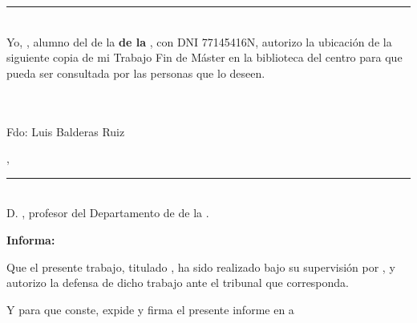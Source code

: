 \documentclass['../proyecto.tex']{memoir}
\begin{document}
\thispagestyle{empty}

\noindent\rule[-1ex]{\textwidth}{2pt}\\[4.5ex]

Yo, \textbf{\AuthorName}, alumno del \Degree de la
\textbf{\FacultyOne de la \University}, con DNI 77145416N, autorizo la
ubicación de la siguiente copia de mi Trabajo Fin de Máster en la
biblioteca del centro para que pueda ser consultada por las personas
que lo deseen.

\vspace{6cm}

\\~\\
\noindent Fdo: Luis Balderas Ruiz

\vspace{2cm}

\begin{flushright}
  \Location, \Time
\end{flushright}

\newpage

\thispagestyle{empty}

\noindent\rule[-1ex]{\textwidth}{2pt}\\[4.5ex]

D. \textbf{\MainProf}, profesor del Departamento de
\Department de la \University.

\vspace{0.5cm}

\textbf{Informa:}

\vspace{0.5cm}

Que el presente trabajo, titulado \textit{\textbf{\ProjectTitle}}, ha
sido realizado bajo su supervisión por \textbf{\AuthorName}, y
autorizo la defensa de dicho trabajo ante el tribunal que
corresponda.

\vspace{0.5cm}

Y para que conste, expide y firma el presente informe en \Location a \Time

\vspace{1cm}

\textbf{\MainProf}

\vspace{5cm}


\newpage
\end{document}
